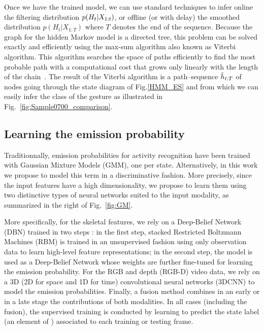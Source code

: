 Once we have the trained model, we can use standard techniques to infer online the filtering
distribution $p(H_t | X_{1:t})$,  or offline (or with delay)
the smoothed distribution $p(H_t | X_{1:T})$ where $T$ denotes the end of the sequence.
Because the graph for the hidden Markov model is a directed tree, this problem can be solved exactly and efficiently using the max-sum algorithm also known as Viterbi algorithm. This algorithm searches the space of paths efficiently to find the most probable path with a computational cost that grows only linearly with the length of the chain~\cite{bishop2006pattern}.
The result of the Viterbi algorithm is a path--sequence $\hat{h}_{t:T}$ of nodes going through the state diagram of
Fig.\ref{HMM_ES} and from which we can easily infer the class of the gesture as illustrated in Fig.~\ref{fig:Sample0700_comparison}.



\subsection{Learning the emission probability \emissionprob{}}
\label{sec:ProblemFormation}

Traditionnally, emission probabilities for activity recognition have been trained with Gaussian Mixture Models (GMM), one per state.
%
Alternatively, in this work we propose to model this term in a discriminative fashion.
More precisely, since the input features have a high dimensionality,
we propose to learn them using two distinctive types of neural networks suited to the input modality,
as summarized in the right of Fig.~\ref{fig:GM}.
%

More specifically, for  the skeletal features, we rely on a Deep-Belief Network (DBN) trained in two steps \cite{salakhutdinov2009learning}:
in the first step,  stacked Restricted Boltzmann Machines (RBM) is trained in an unsupervised fashion using only observation data
to learn  high-level feature representations;
in the second step, the model is used as a Deep-Belief Network whose weights are further fine-tuned
for learning the emission probability.
%
For the RGB and depth (RGB-D) video data, we rely on a 3D (2D for space and 1D for time)
convolutional neural networks (3DCNN) to model the emission probabilities.
%
Finally, a fusion method combines in an early or in a late stage the contributions of both modalities.
%
In all cases (including the fusion), the supervised training is conducted by learning to
predict the state label (an element of \finiteset) associated to each training or testing frame.


